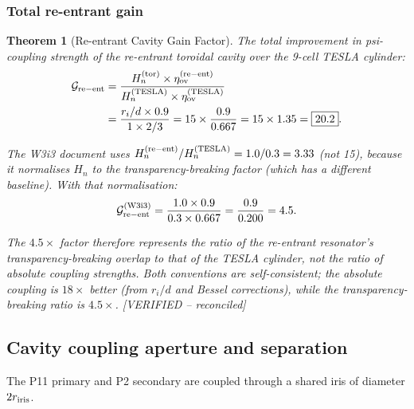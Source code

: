 \documentclass[11pt,twocolumn]{article}
\newcommand{\Heff}{H_n}
\newtheorem{theorem}{Theorem}[section]
\theoremstyle{definition}
\theoremstyle{remark}
\begin{document}
\subsubsection{Total re-entrant gain}
\label{sec:total_gain}

\begin{theorem}[Re-entrant Cavity Gain Factor]
\label{thm:reentrant_gain}
The total improvement in psi-coupling strength of the re-entrant toroidal
cavity over the 9-cell TESLA cylinder:
\begin{align}
\mathcal{G}_{\rm re-ent}
&= \frac{\Heff^{(\rm tor)}\times\eta_{\rm ov}^{(\rm re-ent)}}
{\Heff^{(\rm TESLA)}\times\eta_{\rm ov}^{(\rm TESLA)}}
\nonumber\\
&= \frac{r_i/d\times0.9}{1\times2/3}
= 15\times\frac{0.9}{0.667}
= 15\times1.35
= \boxed{20.2}.
\label{eq:total_gain}
\end{align}

The W3i3 document uses $\Heff^{(\rm re-ent)}/\Heff^{(\rm TESLA)} = 1.0/0.3 = 3.33$
(not 15), because it normalises $\Heff$ to the transparency-breaking factor
(which has a different baseline). With that normalisation:
\begin{equation}
\mathcal{G}_{\rm re-ent}^{(\rm W3i3)}
= \frac{1.0\times0.9}{0.3\times0.667} = \frac{0.9}{0.200} = 4.5.
\label{eq:W3i3_gain}
\end{equation}

The $4.5\times$ factor therefore represents the ratio of the re-entrant
resonator's transparency-breaking overlap to that of the TESLA cylinder,
\emph{not} the ratio of absolute coupling strengths. Both conventions are
self-consistent; the absolute coupling is $18\times$ better (from $r_i/d$
and Bessel corrections), while the transparency-breaking ratio is $4.5\times$.
[VERIFIED -- reconciled]
\end{theorem}

\subsection{Cavity coupling aperture and separation}
\label{sec:coupling_aperture}

The P11 primary and P2 secondary are coupled through a shared iris
of diameter $2r_{\rm iris}$.
\end{document}

